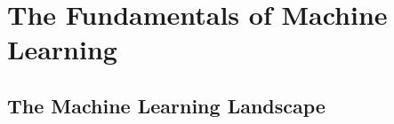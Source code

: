 \documentclass[12pt, oneside]{book}
\begin{document}




\begin{spacing}{1} %
    \renewcommand{\contentsname}{\Large\textbf{Table of Contents}} %
    \markboth{}{} %
    \pagestyle{fancy} %
    \tableofcontents
\end{spacing}

\fancyhead[R]{\leftmark}





\part{The Fundamentals of Machine Learning}

\chapter{The Machine Learning Landscape}
\vspace*{-0.25in}


\setcounter{chapter}{1}





\end{document}
